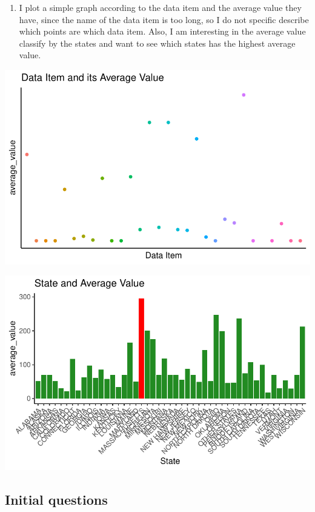 \documentclass[
  letterpaper,
  DIV=11,
  numbers=noendperiod]{scrartcl}
\providecommand{\tightlist}{%
  \setlength{\itemsep}{0pt}\setlength{\parskip}{0pt}}\usepackage{longtable,booktabs,array}
\begin{document}
\begin{enumerate}
\def\labelenumi{\arabic{enumi}.}
\setcounter{enumi}{2}
\tightlist
\item
  I plot a simple graph according to the data item and the average value
  they have, since the name of the data item is too long, so I do not
  specific describe which points are which data item. Also, I am
  interesting in the average value classify by the states and want to
  see which states has the highest average value.
\end{enumerate}

\includegraphics{USDA-NASS-data-cleaning-oct11_files/figure-pdf/unnamed-chunk-26-1.pdf}

\includegraphics{USDA-NASS-data-cleaning-oct11_files/figure-pdf/unnamed-chunk-26-2.pdf}

\hypertarget{initial-questions}{%
\subsection{Initial questions}\label{initial-questions}}
\end{document}
